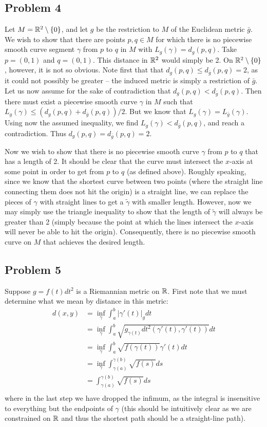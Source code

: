 \documentclass{../../mathnotes}
\begin{document}
\subsection*{Problem 4}

Let $M=\mathbb{R}^2\setminus\left\{0 \right\}$, and let $g$ be the restriction to $M$ of the Euclidean metric $\bar g$. We wish
to show that there are points $p,q\in M$ for which there is no piecewise smooth curve segment $\gamma$ from $p$ to $q$
in $M$ with $L_g(\gamma)=d_g(p,q)$. Take $p=(0,1)$ and $q=(0,1)$. This distance in $\mathbb{R}^2$ would simply be 2. On $\mathbb{R}^2\setminus\left\{ 0 \right\}$,
however, it is not so obvious. Note first that that $d_g(p,q)\leq d_{\bar g}(p,q)=2$, as it could not possibly be greater -- the induced metric
is simply a restriction of $\bar g$. Let us now assume for the sake of contradiction that $d_g(p,q)<d_{\bar g}(p,q)$.
Then there must exist a piecewise smooth curve $\gamma$ in $M$ such that $L_g(\gamma)\leq(d_g(p,q)+d_{\bar g}(p,q))/2$.
But we know that $L_g(\gamma)=L_{\bar g}(\gamma)$. Using now the assumed inequality, we find $L_{g}(\gamma)<d_{\bar g}(p,q)$,
and reach a contradiction. Thus $d_g(p,q)=d_{\bar g}(p,q)=2$.

Now we wish to show that there is no piecewise smooth curve $\gamma$ from $p$ to $q$ that has a length of 2. It should be clear
that the curve must intersect the $x$-axis at some point in order to get from $p$ to $q$ (as defined above). Roughly 
speaking, since we know that the shortest curve between two points (where the straight line connecting them does not hit
the origin) is a straight line, we can replace the pieces of $\gamma$ with straight lines to get a $\tilde \gamma$ with
smaller length. However, now we may simply use the triangle inequality to show that the length of $\tilde \gamma$ will
always be greater than 2 (simply because the point at which the lines intersect the $x$-axis will never be able to hit the
origin). Consequently, there is no piecewise smooth curve on $M$ that achieves the desired length.

\subsection*{Problem 5}

Suppose $g=f(t)dt^2$ is a Riemannian metric on $\mathbb{R}$. First note that we must determine what we mean by distance in this metric:
\begin{align*}
    d(x,y)&=\inf_\gamma\int_a^b|\gamma'(t)|_g dt\\
    &=\inf_\gamma\int_a^b\sqrt{g_{\gamma(t)}dt^2(\gamma'(t),\gamma'(t))} dt\\
    &=\inf_\gamma\int_a^b\sqrt{f(\gamma(t))}\gamma'(t) dt\\
    &=\inf_\gamma\int_{\gamma(a)}^{\gamma(b)}\sqrt{f(s)} ds\\
    &=\int_{\gamma(a)}^{\gamma(b)}\sqrt{f(s)} ds\\
\end{align*}
where in the last step we have dropped the infimum, as the integral is insensitive to everything but the endpoints of $\gamma$
(this should be intuitively clear as we are constrained on $\mathbb{R}$ and thus the shortest path should be a straight-line path).
\end{document}
